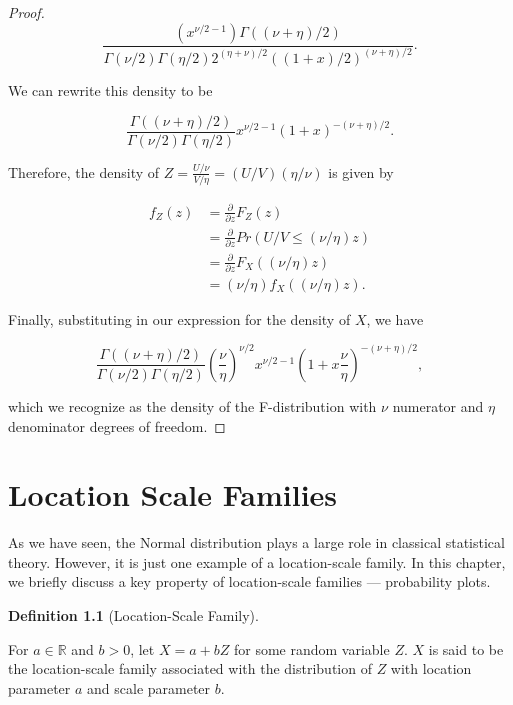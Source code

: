 \documentclass[
  letterpaper,
  DIV=11,
  numbers=noendperiod]{scrreprt}
\theoremstyle{plain}
\theoremstyle{definition}
\newtheorem{definition}{Definition}[chapter]
\theoremstyle{definition}
\theoremstyle{remark}
\begin{document}
\begin{proof}
\[\frac{\left(x^{\nu/2 - 1}\right) \Gamma((\nu+\eta)/2)}{\Gamma(\nu/2)\Gamma(\eta/2) 2^{(\eta + \nu)/2} ((1+x)/2)^{(\nu + \eta)/2}}.\]

We can rewrite this density to be

\[\frac{\Gamma((\nu + \eta)/2)}{\Gamma(\nu/2)\Gamma(\eta/2)} x^{\nu/2 - 1} \left(1 + x\right)^{-(\nu + \eta)/2}.\]

Therefore, the density of \(Z = \frac{U/\nu}{V/\eta} = (U/V)(\eta/\nu)\)
is given by

\[
\begin{aligned}
  f_Z(z)
    &= \frac{\partial}{\partial z} F_Z(z) \\
    &= \frac{\partial}{\partial z} Pr(U/V \leq (\nu/\eta) z) \\
    &= \frac{\partial}{\partial z} F_X((\nu/\eta) z) \\
    &= (\nu/\eta) f_X((\nu/\eta) z).
\end{aligned}
\]

Finally, substituting in our expression for the density of \(X\), we
have

\[\frac{\Gamma((\nu + \eta)/2)}{\Gamma(\nu/2)\Gamma(\eta/2)} \left(\frac{\nu}{\eta}\right)^{\nu/2} x^{\nu/2 - 1} \left(1 + x\frac{\nu}{\eta}\right)^{-(\nu + \eta)/2},\]

which we recognize as the density of the F-distribution with \(\nu\)
numerator and \(\eta\) denominator degrees of freedom.

\end{proof}


\hypertarget{sec-location-scale}{%
\chapter{Location Scale Families}\label{sec-location-scale}}

As we have seen, the Normal distribution plays a large role in classical
statistical theory. However, it is just one example of a location-scale
family. In this chapter, we briefly discuss a key property of
location-scale families --- probability plots.

\begin{definition}[Location-Scale
Family]\protect\hypertarget{def-location-scale}{}\label{def-location-scale}

For \(a \in \mathbb{R}\) and \(b > 0\), let \(X = a + bZ\) for some
random variable \(Z\). \(X\) is said to be the location-scale family
associated with the distribution of \(Z\) with location parameter \(a\)
and scale parameter \(b\).

\end{definition}
\end{document}
